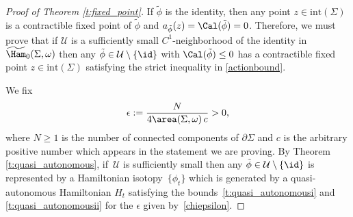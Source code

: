 \begin{proof}[Proof of Theorem \ref{t:fixed_point}]
If $\tilde{\phi}$ is the identity, then any point $z\in \mathrm{int}(\Sigma)$ is a contractible fixed point of $\tilde{\phi}$ and $a_{\tilde\phi}(z)=\Cal(\tilde\phi)=0$. Therefore, we must prove that if $\mathcal{U}$ is a sufficiently small $C^1$-neighborhood of the identity in $\widetilde{\Ham}_0(\Sigma,\omega)$ then any $\tilde{\phi}\in\mathcal{U}\setminus\{\id\}$ with $\Cal(\tilde{\phi}) \leq 0$ has a contractible fixed point $z\in \mathrm{int}(\Sigma)$ satisfying the strict inequality in \eqref{actionbound}.

We fix
\begin{equation}
\label{chiepsilon}
\epsilon := \frac{N}{4 \area(\Sigma,\omega)\, c}>0,
\end{equation}
where $N\geq 1$ is the number of connected components of $\partial \Sigma$ and $c$ is the arbitrary positive number which appears in the statement we are proving.
By Theorem \ref{t:quasi_autonomous}, if~$\mathcal{U}$ is sufficiently small then any
$\tilde{\phi}\in\mathcal{U}\setminus\{\id\}$ is represented by a Hamiltonian isotopy~$\{\phi_t\}$ which is generated by a quasi-autonomous Hamiltonian $H_t$ satisfying the bounds~\eqref{t:quasi_autonomousi}
and \eqref{t:quasi_autonomousii} for the $\epsilon$ given by~\eqref{chiepsilon}.


\end{proof}
